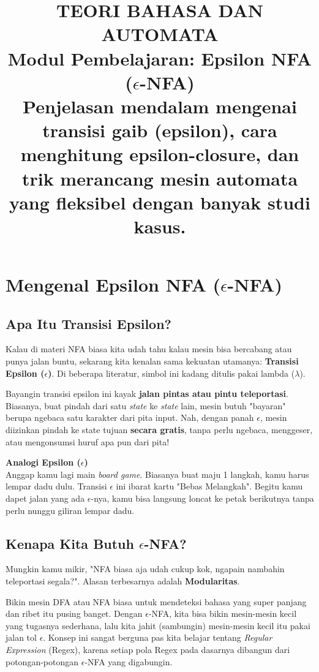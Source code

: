 \documentclass[12pt,a4paper]{article}
\title{
  {\LARGE\bfseries TEORI BAHASA DAN AUTOMATA}\\[0.5em]
  {\large Modul Pembelajaran: Epsilon NFA ($\epsilon$-NFA)}\\[0.8em]
  {\normalsize Penjelasan mendalam mengenai transisi gaib (epsilon), cara menghitung epsilon-closure, dan trik merancang mesin automata yang fleksibel dengan banyak studi kasus.}
}
\author{}
\date{}
\begin{document}
\maketitle
\thispagestyle{fancy}
\tableofcontents
\newpage


\section{Mengenal Epsilon NFA ($\epsilon$-NFA)}

\subsection{Apa Itu Transisi Epsilon?}
Kalau di materi NFA biasa kita udah tahu kalau mesin bisa bercabang atau punya jalan buntu, sekarang kita kenalan sama kekuatan utamanya: \textbf{Transisi Epsilon ($\epsilon$)}. Di beberapa literatur, simbol ini kadang ditulis pakai lambda ($\lambda$).

Bayangin transisi epsilon ini kayak \textbf{jalan pintas atau pintu teleportasi}. Biasanya, buat pindah dari satu \textit{state} ke \textit{state} lain, mesin butuh "bayaran" berupa ngebaca satu karakter dari pita input. Nah, dengan panah $\epsilon$, mesin diizinkan pindah ke state tujuan \textbf{secara gratis}, tanpa perlu ngebaca, menggeser, atau mengonsumsi huruf apa pun dari pita!

\begin{notebox}
\textbf{Analogi Epsilon ($\epsilon$)} \\
Anggap kamu lagi main \textit{board game}. Biasanya buat maju 1 langkah, kamu harus lempar dadu dulu. Transisi $\epsilon$ ini ibarat kartu "Bebas Melangkah". Begitu kamu dapet jalan yang ada $\epsilon$-nya, kamu bisa langsung loncat ke petak berikutnya tanpa perlu nunggu giliran lempar dadu.
\end{notebox}

\subsection{Kenapa Kita Butuh $\epsilon$-NFA?}
Mungkin kamu mikir, "NFA biasa aja udah cukup kok, ngapain nambahin teleportasi segala?". Alasan terbesarnya adalah \textbf{Modularitas}.

Bikin mesin DFA atau NFA biasa untuk mendeteksi bahasa yang super panjang dan ribet itu pusing banget. Dengan $\epsilon$-NFA, kita bisa bikin mesin-mesin kecil yang tugasnya sederhana, lalu kita jahit (sambungin) mesin-mesin kecil itu pakai jalan tol $\epsilon$. Konsep ini sangat berguna pas kita belajar tentang \textit{Regular Expression} (Regex), karena setiap pola Regex pada dasarnya dibangun dari potongan-potongan $\epsilon$-NFA yang digabungin.
\end{document}
